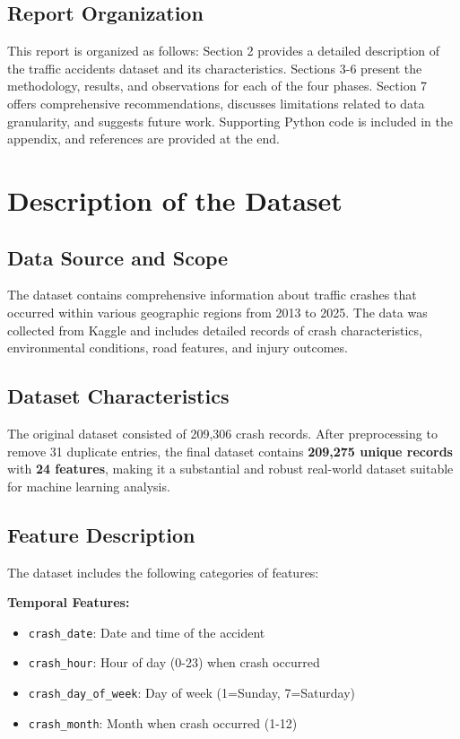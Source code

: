 \documentclass[12pt,man]{apa7}
\begin{document}
\subsection{Report Organization}

This report is organized as follows: Section 2 provides a detailed description of the traffic accidents dataset and its characteristics. Sections 3-6 present the methodology, results, and observations for each of the four phases. Section 7 offers comprehensive recommendations, discusses limitations related to data granularity, and suggests future work. Supporting Python code is included in the appendix, and references are provided at the end.

\section{Description of the Dataset}

\subsection{Data Source and Scope}

The dataset contains comprehensive information about traffic crashes that occurred within various geographic regions from 2013 to 2025. The data was collected from Kaggle and includes detailed records of crash characteristics, environmental conditions, road features, and injury outcomes.

\subsection{Dataset Characteristics}

The original dataset consisted of 209,306 crash records. After preprocessing to remove 31 duplicate entries, the final dataset contains \textbf{209,275 unique records} with \textbf{24 features}, making it a substantial and robust real-world dataset suitable for machine learning analysis.

\subsection{Feature Description}

The dataset includes the following categories of features:

\textbf{Temporal Features:}
\begin{itemize}
    \item \texttt{crash\_date}: Date and time of the accident
    \item \texttt{crash\_hour}: Hour of day (0-23) when crash occurred
    \item \texttt{crash\_day\_of\_week}: Day of week (1=Sunday, 7=Saturday)
    \item \texttt{crash\_month}: Month when crash occurred (1-12)
\end{itemize}
\end{document}
